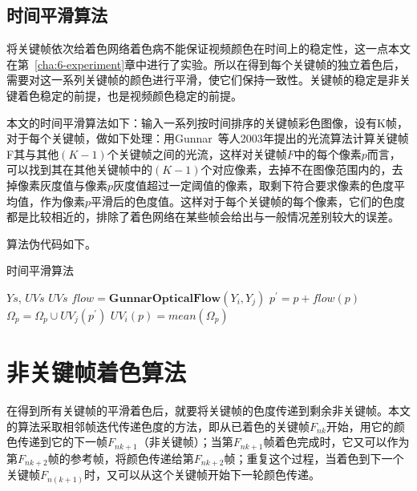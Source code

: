 \subsection{时间平滑算法}
\label{sec:5-temporal-smooth}

  将关键帧依次给着色网络着色病不能保证视频颜色在时间上的稳定性，这一点本文在第~\ref{cha:6-experiment}章中进行了实验。所以在得到每个关键帧的独立着色后，需要对这一系列关键帧的颜色进行平滑，使它们保持一致性。关键帧的稳定是非关键着色稳定的前提，也是视频颜色稳定的前提。

  本文的时间平滑算法如下：输入一系列按时间排序的关键帧彩色图像，设有K帧，对于每个关键帧，做如下处理：用Gunnar~\cite{DBLP:conf/scia/Farneback03}等人2003年提出的光流算法计算关键帧F其与其他$(K-1)$个关键帧之间的光流，这样对关键帧$F$中的每个像素$p$而言，可以找到其在其他关键帧中的$(K-1)$个对应像素，去掉不在图像范围内的，去掉像素灰度值与像素$p$灰度值超过一定阈值的像素，取剩下符合要求像素的色度平均值，作为像素$p$平滑后的色度值。这样对于每个关键帧的每个像素，它们的色度都是比较相近的，排除了着色网络在某些帧会给出与一般情况差别较大的误差。

  算法伪代码如下。

  \begin{algorithm}[H]
  \label{algo:5-temporal-smooth}
    \caption*{时间平滑算法}
    \begin{algorithmic}[1]
      \Require $Ys$, $UVs$
      \Ensure  $UVs$
            \State $flow = \textbf{GunnarOpticalFlow}(Y_i, Y_j)$
              \State $p^{'} = p + flow(p)$
                \State $\Omega_p = \Omega_p \cup UV_j(p^{'})$
              \EndIf
            \EndFor
          \EndFor
            \State $UV_i(p) = mean(\Omega_p)$
          \EndFor
        \EndFor
      \EndFunction
    \end{algorithmic}
  \end{algorithm}

\section{非关键帧着色算法}
\label{sec:5-interframe-color}

  在得到所有关键帧的平滑着色后，就要将关键帧的色度传递到剩余非关键帧。本文的算法采取相邻帧迭代传递色度的方法，即从已着色的关键帧$F_{nk}$开始，用它的颜色传递到它的下一帧$F_{nk+1}$（非关键帧）；当第$F_{nk+1}$帧着色完成时，它又可以作为第$F_{nk+2}$帧的参考帧，将颜色传递给第$F_{nk+2}$帧；重复这个过程，当着色到下一个关键帧$F_{n(k+1)}$时，又可以从这个关键帧开始下一轮颜色传递。

